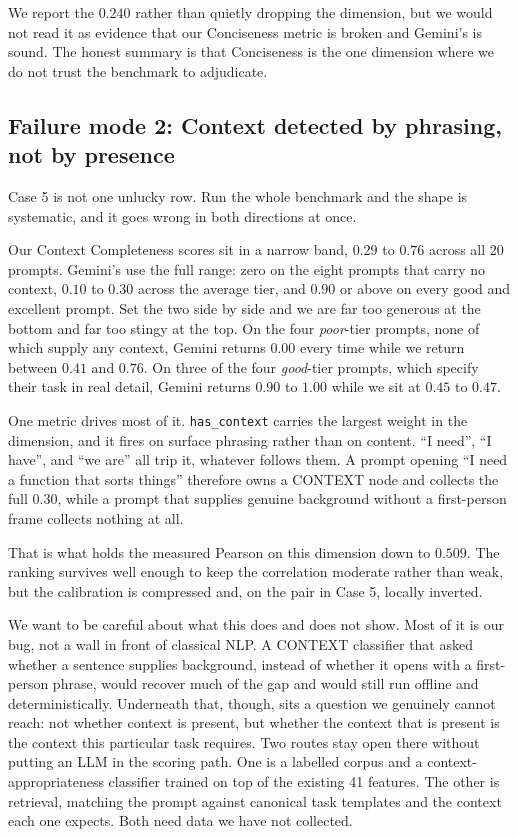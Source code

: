 \documentclass[conference]{IEEEtran}
\begin{document}
We report the $0.240$ rather than quietly dropping the dimension, but we would not read it as evidence that our Conciseness metric is broken and Gemini's is sound. The honest summary is that Conciseness is the one dimension where we do not trust the benchmark to adjudicate.

\subsection{Failure mode 2: Context detected by phrasing, not by presence}
\label{sec:failure2}
Case 5 is not one unlucky row. Run the whole benchmark and the shape is systematic, and it goes wrong in both directions at once.

Our Context Completeness scores sit in a narrow band, $0.29$ to $0.76$ across all 20 prompts. Gemini's use the full range: zero on the eight prompts that carry no context, $0.10$ to $0.30$ across the average tier, and $0.90$ or above on every good and excellent prompt. Set the two side by side and we are far too generous at the bottom and far too stingy at the top. On the four \emph{poor}-tier prompts, none of which supply any context, Gemini returns $0.00$ every time while we return between $0.41$ and $0.76$. On three of the four \emph{good}-tier prompts, which specify their task in real detail, Gemini returns $0.90$ to $1.00$ while we sit at $0.45$ to $0.47$.

One metric drives most of it. \texttt{has\_context} carries the largest weight in the dimension, and it fires on surface phrasing rather than on content. ``I need'', ``I have'', and ``we are'' all trip it, whatever follows them. A prompt opening ``I need a function that sorts things'' therefore owns a CONTEXT node and collects the full $0.30$, while a prompt that supplies genuine background without a first-person frame collects nothing at all.

That is what holds the measured Pearson on this dimension down to $0.509$. The ranking survives well enough to keep the correlation moderate rather than weak, but the calibration is compressed and, on the pair in Case 5, locally inverted.

We want to be careful about what this does and does not show. Most of it is our bug, not a wall in front of classical NLP. A CONTEXT classifier that asked whether a sentence supplies background, instead of whether it opens with a first-person phrase, would recover much of the gap and would still run offline and deterministically. Underneath that, though, sits a question we genuinely cannot reach: not whether context is present, but whether the context that is present is the context this particular task requires. Two routes stay open there without putting an LLM in the scoring path. One is a labelled corpus and a context-appropriateness classifier trained on top of the existing 41 features. The other is retrieval, matching the prompt against canonical task templates and the context each one expects. Both need data we have not collected.
\end{document}

